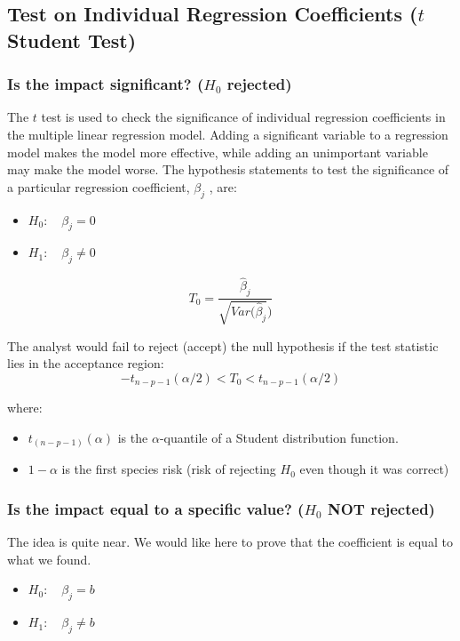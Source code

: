 \documentclass[a4paper]{article}
\theoremstyle{plain}
\begin{document}
\subsection{Test on Individual Regression Coefficients ($t$ Student Test)}

\subsubsection{Is the impact significant? ($H_0$ rejected)}

The $t$ test is used to check the significance of individual regression coefficients in the multiple linear regression model. Adding a significant variable to a regression model makes the model more effective, while adding an unimportant variable may make the model worse. The hypothesis statements to test the significance of a particular regression coefficient, $\beta_j$ , are: 

\begin{itemize}
\item $H_0: \quad \beta_j = 0$
\item $H_1: \quad \beta_j \neq 0$ 
\end{itemize}

$$ T_0 = \frac{\hat \beta_j}{\sqrt{Var(\hat \beta_j})}$$

The analyst would fail to reject (accept) the null hypothesis if the test statistic lies in the acceptance region: 
$$ -t_{n-p-1}(\alpha/2)< T_0 < t_{n-p-1}(\alpha/2) $$

where:
\begin{itemize}
\item $t_{(n-p-1)}(\alpha)$ is the $\alpha$-quantile of a Student distribution function.
\item $1- \alpha$ is the first species risk (risk of rejecting $H_0$ even though it was correct)
\end{itemize}


\subsubsection{Is the impact equal to a specific value? ($H_0$ NOT rejected)}
The idea is quite near. We would like here to prove that the coefficient is equal to what we found.

\begin{itemize}
\item $H_0: \quad \beta_j = b$
\item $H_1: \quad \beta_j \neq b$ 
\end{itemize}
\end{document}
